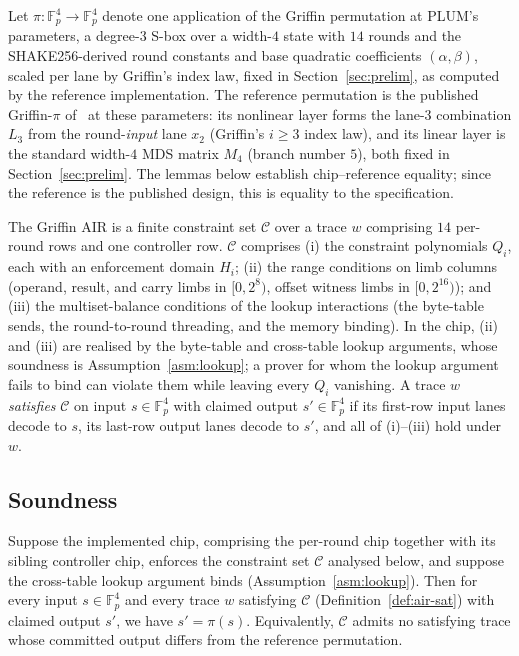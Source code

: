 \begin{definition}\label{def:ref-perm}
Let $\pi\colon\mathbb{F}_p^{4}\to\mathbb{F}_p^{4}$ denote one application of the Griffin permutation at PLUM's parameters, a degree-$3$ S-box over a width-$4$ state with $14$ rounds and the SHAKE256-derived round constants and base quadratic coefficients $(\alpha,\beta)$, scaled per lane by Griffin's index law, fixed in Section~\ref{sec:prelim}, as computed by the reference implementation. The reference permutation is the published Griffin-$\pi$ of~\cite{cryptoeprint:2022/403} at these parameters: its nonlinear layer forms the lane-$3$ combination $L_3$ from the round-\emph{input} lane $x_2$ (Griffin's $i\ge 3$ index law), and its linear layer is the standard width-$4$ MDS matrix $M_4$ (branch number $5$), both fixed in Section~\ref{sec:prelim}. The lemmas below establish chip--reference equality; since the reference is the published design, this is equality to the specification.
\end{definition}

\begin{definition}\label{def:air-sat}
The Griffin AIR is a finite constraint set $\mathcal{C}$ over a trace $w$ comprising $14$ per-round rows and one controller row. $\mathcal{C}$ comprises (i) the constraint polynomials $Q_i$, each with an enforcement domain $H_i$; (ii) the range conditions on limb columns (operand, result, and carry limbs in $[0,2^{8})$, offset witness limbs in $[0,2^{16})$); and (iii) the multiset-balance conditions of the lookup interactions (the byte-table sends, the round-to-round threading, and the memory binding). In the chip, (ii) and (iii) are realised by the byte-table and cross-table lookup arguments, whose soundness is Assumption~\ref{asm:lookup}; a prover for whom the lookup argument fails to bind can violate them while leaving every $Q_i$ vanishing. A trace $w$ \emph{satisfies} $\mathcal{C}$ on input $s\in\mathbb{F}_p^{4}$ with claimed output $s'\in\mathbb{F}_p^{4}$ if its first-row input lanes decode to $s$, its last-row output lanes decode to $s'$, and all of (i)--(iii) hold under $w$.
\end{definition}

\subsection{Soundness}\label{app:air-soundness}
\begin{theorem}\label{thm:air-sound}
Suppose the implemented chip, comprising the per-round chip together with its sibling controller chip, enforces the constraint set $\mathcal{C}$ analysed below, and suppose the cross-table lookup argument binds (Assumption~\ref{asm:lookup}). Then for every input $s\in\mathbb{F}_p^{4}$ and every trace $w$ satisfying $\mathcal{C}$ (Definition~\ref{def:air-sat}) with claimed output $s'$, we have $s'=\pi(s)$. Equivalently, $\mathcal{C}$ admits no satisfying trace whose committed output differs from the reference permutation.
\end{theorem}

